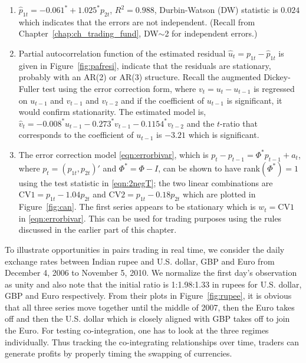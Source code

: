\begin{enumerate}[--]
\item $\hat{p}_{1t}= -0.061^* + 1.025^* p_{2t}$, $R^2=0.988$, Durbin-Watson (DW) statistic is $0.024$ which indicates that the errors are not independent. (Recall from Chapter~\ref{chap:ch_trading_fund}, DW$\sim$2 for independent errors.)

\item Partial autocorrelation function of the estimated residual $\hat{u}_t= p_{1t} - \hat{p}_{1t}$ is given in Figure~\ref{fig:pafresi}, indicate that the residuals are stationary, probably with an AR(2) or AR(3) structure. Recall the augmented Dickey-Fuller test using the error correction form, where $v_t= u_t - u_{t-1}$ is regressed on $u_{t-1}$ and $v_{t-1}$ and $v_{t-2}$ and if the coefficient of $u_{t-1}$ is significant, it would confirm stationarity. The estimated model is, $\hat{v}_t= -0.008^* u_{t-1} - 0.273^* v_{t-1} - 0.1154^* v_{t-2}$ and the $t$-ratio that corresponds to the coefficient of $u_{t-1}$ is $-3.21$ which is significant. 

\item The error correction model \eqref{eqn:errorbivar}, which is $p_t - p_{t-1}= \Phi^* p_{t-1} + a_t$, where $p_t= (p_{1t}, p_{2t})'$ and $\Phi^* = \Phi-I$, can be shown to have rank$(\Phi^*)=1$ using the test statistic in \eqref{eqn:2negT}; the two linear combinations are $\text{CV1}= p_{1t} - 1.04 p_{2t}$ and $\text{CV2}= p_{1t} - 0.18 p_{2t}$ which are plotted in Figure~\ref{fig:can}. The first series appears to be stationary which is $w_t= \text{CV1}$ in \eqref{eqn:errorbivar}. This can be used for trading purposes using the rules discussed in the earlier part of this chapter. 
\end{enumerate}


To illustrate opportunities in pairs trading in real time, we consider the daily exchange rates between Indian rupee and U.S. dollar, GBP and Euro from December 4, 2006 to November 5, 2010. We normalize the first day's observation as unity and also note that the initial ratio is 1:1.98:1.33 in rupees for U.S. dollar, GBP and Euro respectively. From their plots in Figure~\ref{fig:rupee}, it is obvious that all three series move together until the middle of 2007, then the Euro takes off and then the U.S. dollar which is closely aligned with GBP takes off to join the Euro. For testing co-integration, one has to look at the three regimes individually. Thus tracking the co-integrating relationships over time, traders can generate profits by properly timing the swapping of currencies.

